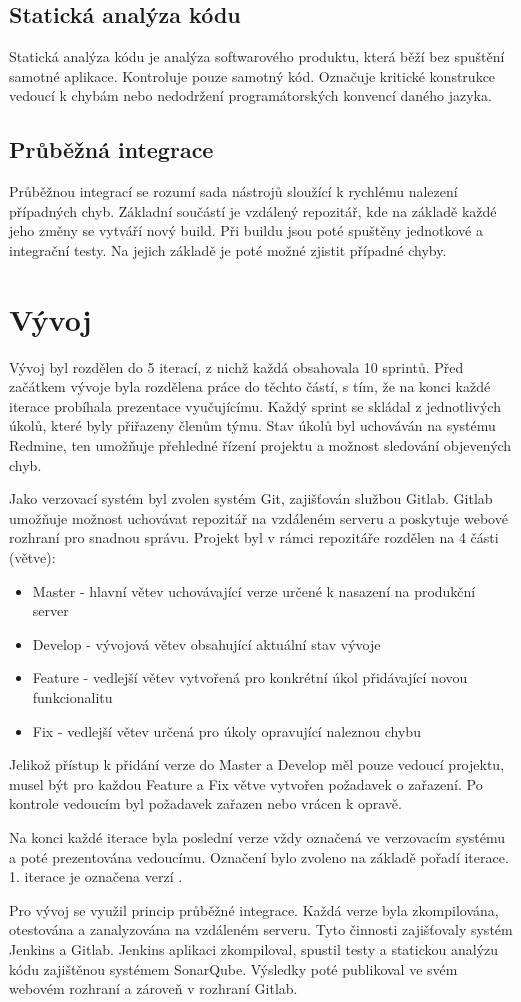\documentclass[thesis=B,czech]{FITthesis}[2012/06/26]
\begin{document}
\subsection{Statická analýza kódu}
Statická analýza kódu je analýza softwarového produktu, která běží bez spuštění samotné aplikace. Kontroluje 
pouze samotný kód. Označuje kritické konstrukce vedoucí k chybám nebo nedodržení programátorských konvencí daného
jazyka.
\subsection{Průběžná integrace}
Průběžnou integrací se rozumí sada nástrojů sloužící k rychlému nalezení případných chyb. Základní součástí je vzdálený repozitář, kde na 
základě každé jeho změny se vytváří nový build. Při buildu jsou poté spuštěny jednotkové a integrační testy.
Na jejich základě je poté možné zjistit případné chyby.

\section{Vývoj}
Vývoj byl rozdělen do 5 iterací, z nichž každá obsahovala 10 sprintů. Před začátkem vývoje byla rozdělena práce do těchto částí, 
s tím, že na konci každé iterace probíhala prezentace vyučujícímu. Každý sprint se skládal z jednotlivých
úkolů, které byly přiřazeny členům týmu. Stav úkolů byl uchováván na systému Redmine, ten umožňuje přehledné řízení projektu
a možnost sledování objevených chyb.
\par
Jako verzovací systém byl zvolen systém Git, zajišťován službou Gitlab. Gitlab umožňuje možnost uchovávat
repozitář na vzdáleném serveru a poskytuje webové rozhraní pro snadnou správu. Projekt byl v rámci repozitáře rozdělen na 4 části (větve):
\begin{itemize}
\item Master - hlavní větev uchovávající verze určené k nasazení na produkční server
\item Develop - vývojová větev obsahující aktuální stav vývoje
\item Feature - vedlejší větev vytvořená pro konkrétní úkol přidávající novou funkcionalitu
\item Fix - vedlejší větev určená pro úkoly opravující naleznou chybu
\end{itemize}
Jelikož přístup k přidání verze do Master a Develop měl pouze vedoucí projektu, musel být pro každou Feature a Fix větve
vytvořen požadavek o zařazení. Po kontrole vedoucím byl požadavek zařazen nebo vrácen k opravě.
\par
Na konci každé iterace byla poslední verze vždy označená ve verzovacím systému a poté prezentována vedoucímu.
Označení bylo zvoleno na základě pořadí iterace. 1. iterace je označena verzí .
\par
Pro vývoj se využil princip průběžné integrace. Každá verze byla zkompilována, otestována a zanalyzována na vzdáleném serveru.
Tyto činnosti zajišťovaly systém Jenkins a Gitlab. Jenkins aplikaci zkompiloval, spustil testy a statickou analýzu kódu 
zajištěnou systémem SonarQube. Výsledky poté publikoval ve svém webovém rozhraní a zároveň v rozhraní Gitlab.  
\end{document}
